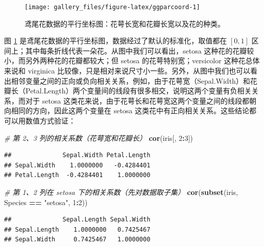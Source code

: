 \documentclass[
  b5paper,
  UTF8,twoside]{book}
\newenvironment{Shaded}{\begin{snugshade}}{\end{snugshade}}
\newcommand{\CommentTok}[1]{\textcolor[rgb]{0.56,0.35,0.01}{\textit{#1}}}
\newcommand{\DecValTok}[1]{\textcolor[rgb]{0.00,0.00,0.81}{#1}}
\newcommand{\FunctionTok}[1]{\textcolor[rgb]{0.13,0.29,0.53}{\textbf{#1}}}
\newcommand{\NormalTok}[1]{#1}
\newcommand{\SpecialCharTok}[1]{\textcolor[rgb]{0.81,0.36,0.00}{\textbf{#1}}}
\newcommand{\StringTok}[1]{\textcolor[rgb]{0.31,0.60,0.02}{#1}}
\begin{document}
\begin{figure}

{\centering \texttt{[image: gallery\_files/figure-latex/ggparcoord-1]} 

}

\caption[鸢尾花数据的平行坐标图]{鸢尾花数据的平行坐标图：花萼长宽和花瓣长宽以及花的种类。}\label{fig:ggparcoord}
\end{figure}

图 \ref{fig:ggparcoord} 是鸢尾花数据的平行坐标图，数据经过了默认的标准化，取值都在 \([0,1]\) 区间上；其中每条折线代表一朵花。从图中我们可以看出，setosa 这种花的花瓣较小，而另外两种花的花瓣都较大；但 setosa 的花萼特别宽；versicolor 这种花总体来说和 virginica 比较像，只是相对来说尺寸小一些。另外，从图中我们也可以看出相邻变量之间的正向或负向相关关系，例如，由于花萼宽（Sepal.Width）和花瓣长（Petal.Length）两个变量间的线段有很多相交，说明这两个变量有负相关关系，而对于 setosa 这类花来说，由于花萼长和花萼宽这两个变量之间的线段都朝向相同的方向，因此这两个变量在 setosa 这类花中有正向相关关系。这些结论都可以用数值方式验证：

\begin{Shaded}
\begin{Highlighting}[]
\CommentTok{\# 第 2、3 列的相关系数（花萼宽和花瓣长）}
\FunctionTok{cor}\NormalTok{(iris[, }\DecValTok{2}\SpecialCharTok{:}\DecValTok{3}\NormalTok{])}
\end{Highlighting}
\end{Shaded}

\begin{verbatim}
##              Sepal.Width Petal.Length
## Sepal.Width    1.0000000   -0.4284401
## Petal.Length  -0.4284401    1.0000000
\end{verbatim}

\begin{Shaded}
\begin{Highlighting}[]
\CommentTok{\# 第 1、2 列在 setosa 下的相关系数（先对数据取子集）}
\FunctionTok{cor}\NormalTok{(}\FunctionTok{subset}\NormalTok{(iris, Species }\SpecialCharTok{==} \StringTok{"setosa"}\NormalTok{, }\DecValTok{1}\SpecialCharTok{:}\DecValTok{2}\NormalTok{))}
\end{Highlighting}
\end{Shaded}

\begin{verbatim}
##              Sepal.Length Sepal.Width
## Sepal.Length    1.0000000   0.7425467
## Sepal.Width     0.7425467   1.0000000
\end{verbatim}
\end{document}

